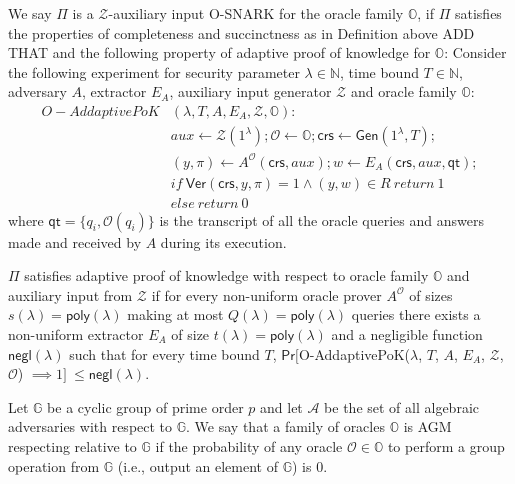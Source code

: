 \begin{definition}[O-SNARKs]
\label{def:osnarks}
We say $\Pi$ is a $\mathcal{Z}$-auxiliary input O-SNARK for the oracle family $\mathbb{O}$, 
if $\Pi$ satisfies the properties of completeness and 
succinctness as in Definition above {\color{red} ADD THAT} 
and the following property of adaptive proof of knowledge for $\mathbb{O}$:
Consider the following experiment for security parameter $\lambda \in \mathbb{N}$, 
time bound $T \in \mathbb{N}$, adversary $A$, extractor $E_A$, 
auxiliary input generator $\mathcal{Z}$ and oracle family $\mathbb{O}$:\\

\begin{align*}
O-AddaptivePoK&(\lambda, T, A, E_A, \mathcal{Z}, \mathbb{O}): \\
& \mathit{aux} \leftarrow \mathcal{Z}(1^{\lambda}); \mathcal{O} \leftarrow \mathbb{O}; \mathsf{crs} \leftarrow \mathsf{Gen}(1^{\lambda},T); \\
& (y,\pi) \leftarrow A^{\mathcal{O}}(\mathsf{crs},\mathit{aux}); w \leftarrow E_A(\mathsf{crs}, \mathit{aux}, \mathsf{qt}); \\
& if \ \mathsf{Ver}(\mathsf{crs}, y, \pi) = 1 \wedge (y,w) \in R \ return  \ 1 \\
& else \ return \ 0
\end{align*}
\noindent where $\mathsf{qt} = \{q_i, \mathcal{O}(q_i)\}$ is the transcript of all the oracle queries and answers made and received by $A$ during its execution. 

$\Pi$ satisfies adaptive proof of knowledge with respect to oracle family  $\mathbb{O}$ and auxiliary input from $\mathcal{Z}$ 
if for every non-uniform oracle prover $A^{\mathcal{O}}$ of sizes $s(\lambda)= \mathsf{poly}(\lambda)$ making at most 
$Q(\lambda) = \mathsf{poly}(\lambda)$ queries there exists a non-uniform extractor
$E_A$ of size $t(\lambda)=\mathsf{poly}(\lambda)$ and a negligible function $\mathsf{negl}(\lambda)$ 
such that for every time bound $T$, 
$\mathsf{Pr}[$O-AddaptivePoK($\lambda$, $T$, $A$, $E_A$, $\mathcal{Z}$, $\mathcal{O}$) $ \implies  1]\ \leq \mathsf{negl}(\lambda)$. 
\end{definition} 

\begin{definition}
\label{def:agm_oracles}
Let $\mathbb{G}$ be a cyclic group of prime order $p$ and let $\mathcal{A}$ be the set of all algebraic adversaries with 
respect to $\mathbb{G}$. We say that a family of oracles $\mathbb{O}$ is AGM respecting relative to $\mathbb{G}$ if 
the probability of any oracle $\mathcal{O} \in \mathbb{O}$ to perform a group operation from $\mathbb{G}$ 
(i.e., output an element of $\mathbb{G}$) is $0$. 
\end{definition}

